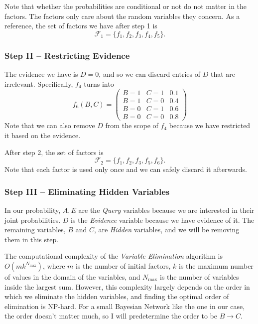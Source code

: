 \documentclass{article}
\theoremstyle{definition}
\begin{document}
Note that whether the probabilities are conditional or not do not matter in the factors. The factors only care about the random variables they concern. As a reference, the set of factors we have after step 1 is
\[\mathcal{F}_1 = \{f_1, f_2, f_3, f_4, f_5\}.\]

\subsubsection{Step II -- Restricting Evidence}

The evidence we have is \(D = 0\), and so we can discard entries of \(D\) that are irrelevant. Specifically, \(f_4\) turns into
\[f_6(B, C) = \begin{pmatrix}
    B = 1 & C = 1 & 0.1 \\
    B = 1 & C = 0 & 0.4 \\
    B = 0 & C = 1 & 0.6 \\
    B = 0 & C = 0 & 0.8
\end{pmatrix}\]
Note that we can also remove \(D\) from the scope of \(f_4\) because we have restricted it based on the evidence.

After step 2, the set of factors is
\[\mathcal{F}_2 = \{f_1, f_2, f_3, f_5, f_6\}.\]
Note that each factor is used only once and we can safely discard it afterwards.

\subsubsection{Step III -- Eliminating Hidden Variables}

In our probability, \(A, E\) are the \textit{Query} variables because we are interested in their joint probabilities. \(D\) is the \textit{Evidence} variable because we have evidence of it. The remaining variables, \(B\) and \(C\), are \textit{Hidden} variables, and we will be removing them in this step.

The computational complexity of the \textit{Variable Elimination} algorithm is \(O(mk^{N_{\max}})\), where \(m\) is the number of initial factors, \(k\) is the maximum number of values in the domain of the variables, and \(N_{\max}\) is the number of variables inside the largest sum. However, this complexity largely depends on the order in which we eliminate the hidden variables, and finding the optimal order of elimination is \textsf{NP}-hard. For a small Bayesian Network like the one in our case, the order doesn't matter much, so I will predetermine the order to be \(B \to C\).
\end{document}
